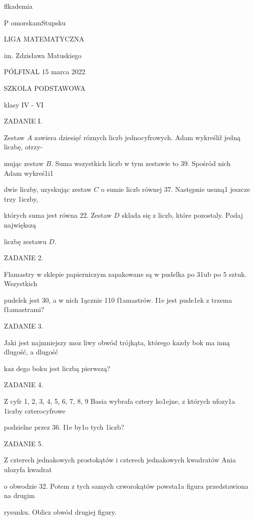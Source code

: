 \documentclass[a4paper,12pt]{article}
\begin{document}
flkademia

P omorskamStupsku

LIGA MATEMATYCZNA

im. Zdzisława Matuskiego

PÓLFINAL 15 marca 2022

SZKOLA PODSTAWOWA

klasy IV - VI

ZADANIE I.

Zestaw $A$ zawiera dziesięć róznych liczb jednocyfrowych. Adam wykreślił jedną liczbę, otrzy-

mując zestaw $B$. Suma wszystkich liczb w tym zestawie to 39. Spośród nich Adam wykreś1i1

dwie liczby, uzyskując zestaw $C$ o sumie liczb równej 37. Następnie usuną1 jeszcze trzy 1iczby,

których suma jest równa 22. Zestaw $D$ sklada się z liczb, które pozostaly. Podaj największą

liczbę zestawu $D.$

ZADANIE 2.

Flamastry w sklepie papierniczym zapakowane są w pudelka po 31ub po 5 sztuk. Wszystkich

pudelek jest 30, a w nich 1ącznie 110 f1amastrów. I1e jest pude1ek z trzema f1amastrami?

ZADANIE 3.

Jaki jest najmniejszy $\mathrm{m}\mathrm{o}\dot{\mathrm{z}}$ liwy obwód trójkąta, którego $\mathrm{k}\mathrm{a}\dot{\mathrm{z}}\mathrm{d}\mathrm{y}$ bok ma inną dlugość, a dlugość

$\mathrm{k}\mathrm{a}\dot{\mathrm{z}}$ dego boku jest liczbą pierwszą?

ZADANIE 4.

$\mathrm{Z}$ cyfr 1, 2, 3, 4, 5, 6, 7, 8, 9 Basia wybrafa cztery ko1ejne, z których ufozy1a 1iczby czterocyfrowe

podzielne przez 36. I1e by1o tych 1iczb?

ZADANIE 5.

$\mathrm{Z}$ czterech jednakowych prostokątów i czterech jednakowych kwadratów Ania ulozyfa kwadrat

o obwodzie 32. Potem z tych samych czworokątów powsta1a figura przedstawiona na drugim

rysunku. Oblicz obwód drugiej figury.
\end{document}
